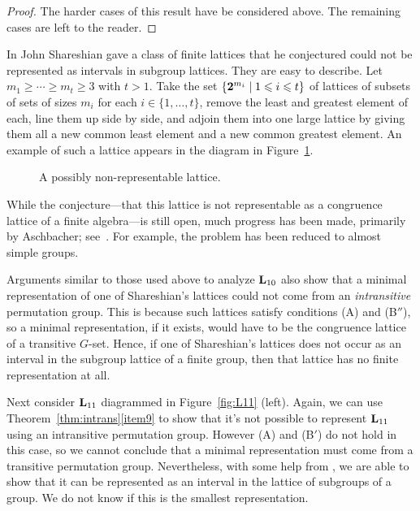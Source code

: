 \begin{proof}
The harder cases of this result have be considered above. The
remaining cases are left to the reader.
\end{proof}


In \cite{Shareshian2003} John Shareshian gave a class of finite 
lattices that he conjectured could not be represented as intervals 
in subgroup lattices. They are easy to describe. 
Let $m_1 \ge \cdots \ge m_t \ge 3$ with $t> 1$.
Take the set $\{\mathbf{2}^{m_i} \mid 1\leqslant i \leqslant t\}$ of 
lattices of subsets of sets of sizes $m_i$ for 
each $i\in \{1,\ldots,t\}$, remove
the least and greatest element of each, line them up side 
by side, and adjoin
them into one large lattice by giving them all a new common 
least element and a
new common greatest element.
An example of such a lattice appears in the diagram 
in Figure~\ref{fig:shareshian}.

\begin{figure}[htb]
\begin{center}
\end{center}
\caption{A possibly non-representable lattice.}\label{fig:shareshian}
\end{figure}
While the conjecture---that this lattice is not
representable as a congruence lattice of a finite algebra---is still open, much
progress has been made, primarily by Aschbacher; see~\cite{Aschbacher2013}.
For example, the problem has been reduced to almost simple groups.


Arguments similar to those used above to analyze $\mathbf{L}_{10}$
also show that a minimal representation of one of Shareshian's
lattices could not come from an \emph{intransitive} permutation group.
This is because such lattices satisfy conditions (A) and (B$''$),
so a minimal representation, if it exists, would have to be
the congruence lattice of a transitive $G$-set.
Hence, if one of Shareshian's lattices does not occur as an
interval in the subgroup lattice of a finite group, then that lattice has
no finite representation at all.



Next consider $\mathbf{L}_{11}$ diagrammed in Figure~\ref{fig:L11} (left). Again, we
can use Theorem~\ref{thm:intrans}\eqref{item9} to show that it's not possible to
represent $\mathbf{L}_{11}$ using an intransitive permutation group. However (A) and
(B$'$) do not hold in this case, so we cannot conclude that a minimal representation
must come from a transitive permutation group. Nevertheless, with some help from
\gap, we are able to show that it can be represented as an interval
in the lattice of subgroups of a group. We do not know if this is the
smallest representation.


